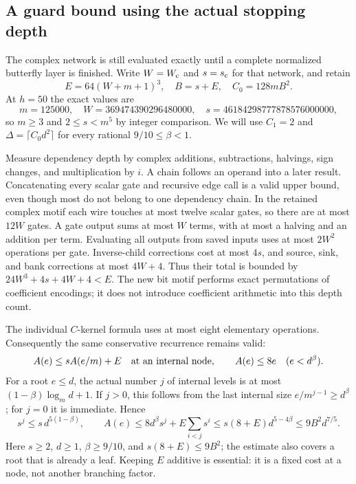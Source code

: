 \subsection{A guard bound using the actual stopping depth}
\label{sec:stopped-guard}
The complex network is still evaluated exactly until a complete normalized
butterfly layer is finished. Write $W=W_{\rm c}$ and $s=s_{\rm c}$ for that
network, and retain
\[
 E=64(W+m+1)^3,\quad B=s+E,\quad C_0=128mB^2.
\]
At $h=50$ the exact values are
\[
 m=125000,\quad W=369474390296480000,\quad
 s=46184298777878576000000,
\]
so $m\ge3$ and $2\le s<m^5$ by integer comparison. We will use $C_1=2$ and
$\Delta=\lceil C_0d^2\rceil$ for every rational $9/10\le\beta<1$.

Measure dependency depth by complex additions, subtractions, halvings, sign
changes, and multiplication by $i$. A chain follows an operand into a later
result. Concatenating every scalar gate and recursive edge call is a valid
upper bound, even though most do not belong to one dependency chain.
In the retained complex motif each wire touches at most twelve scalar gates,
so there are at most $12W$ gates. A gate output sums at most $W$ terms,
with at most a halving and an addition per term. Evaluating all outputs from
saved inputs uses at most $2W^2$ operations per gate. Inverse-child corrections
cost at most $4s$, and source, sink, and bank corrections at most $4W+4$.
Thus their total is bounded by $24W^3+4s+4W+4<E$.
The new bit motif performs exact permutations of coefficient encodings; it
does not introduce coefficient arithmetic into this depth count.

The individual $C$-kernel formula uses at most eight elementary operations.
Consequently the same conservative recurrence remains valid:
\[
 A(e)\le sA(e/m)+E\quad\hbox{at an internal node},\qquad
 A(e)\le8e\quad(e<d^\beta).
\]
For a root $e\le d$, the actual number $j$ of internal levels is at most
$(1-\beta)\log_m d+1$. If $j>0$, this follows from the last internal size
$e/m^{j-1}\ge d^\beta$; for $j=0$ it is immediate. Hence
\[
 s^j\le s\,d^{5(1-\beta)},\qquad
 A(e)\le8d^\beta s^j+E\sum_{i<j}s^i
       \le s(8+E)d^{5-4\beta}
       \le9B^2d^{7/5}.
\]
Here $s\ge2$, $d\ge1$, $\beta\ge9/10$, and
$s(8+E)\le9B^2$; the estimate also covers a root that is already a leaf.
Keeping $E$ additive is essential: it is a fixed cost at a node, not another
branching factor.

